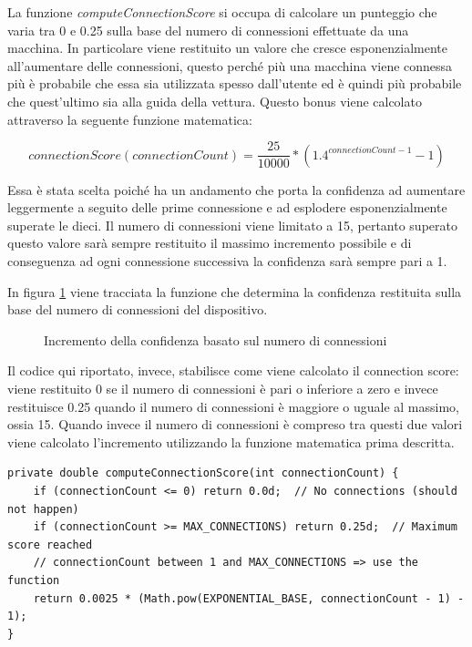 La funzione \textit{computeConnectionScore} si occupa di calcolare un punteggio che varia tra 0 e 0.25 sulla base del numero di connessioni effettuate da una macchina. In particolare viene restituito un valore che cresce esponenzialmente all'aumentare delle connessioni, questo perché più una macchina viene connessa più è probabile che essa sia utilizzata spesso dall'utente ed è quindi più probabile che quest'ultimo sia alla guida della vettura. Questo bonus viene calcolato attraverso la seguente funzione matematica:

\[connectionScore(connectionCount) = \frac{25}{10000} * (1.4^{connectionCount-1} - 1)\]

Essa è stata scelta poiché ha un andamento che porta la confidenza ad aumentare leggermente a seguito delle prime connessione e ad esplodere esponenzialmente superate le dieci. Il numero di connessioni viene limitato a 15, pertanto superato questo valore sarà sempre restituito il massimo incremento possibile e di conseguenza ad ogni connessione successiva la confidenza sarà sempre pari a 1. 

In figura \ref{fig:confidence-func} viene tracciata la funzione che determina la confidenza restituita sulla base del numero di connessioni del dispositivo. 

\begin{figure}[H]
    \centering
    \caption{Incremento della confidenza basato sul numero di connessioni}
    \label{fig:confidence-func}
\end{figure}

Il codice qui riportato, invece, stabilisce come viene calcolato il connection score: viene restituito 0 se il numero di connessioni è pari o inferiore a zero e invece restituisce 0.25 quando il numero di connessioni è maggiore o uguale al massimo, ossia 15. Quando invece il numero di connessioni è compreso tra questi due valori viene calcolato l'incremento utilizzando la funzione matematica prima descritta.
\begin{verbatim}
private double computeConnectionScore(int connectionCount) {
    if (connectionCount <= 0) return 0.0d;  // No connections (should not happen)
    if (connectionCount >= MAX_CONNECTIONS) return 0.25d;  // Maximum score reached
    // connectionCount between 1 and MAX_CONNECTIONS => use the function
    return 0.0025 * (Math.pow(EXPONENTIAL_BASE, connectionCount - 1) - 1);
}
\end{verbatim}

